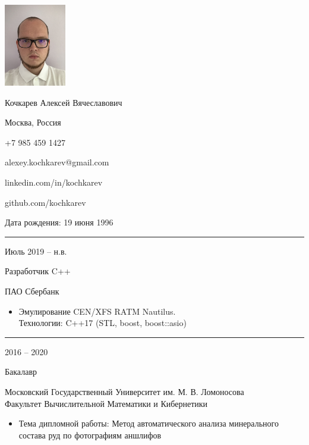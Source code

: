 \documentclass[a4paper,10pt]{article}
\newlength{\cvcolumngapwidth}
\newlength{\cvleftcolumnwidth}
\newlength{\cvrightcolumnwidth}
\newcommand{\cvnamestyle}[1]{{\Large\cvnamefont\textcolor{cvnamecolor}{#1}}}
\newcommand{\cvsectionstyle}[1]{{\normalsize\cvsectionfont\textcolor{cvsectioncolor}{#1}}}
\newcommand{\cvtitlestyle}[1]{{\large\cvtitlefont\textcolor{cvtitlecolor}{#1}}}
\newcommand{\cvdurationstyle}[1]{{\small\cvdurationfont\textcolor{cvdurationcolor}{#1}}}
\newlength{\cvafteritemskipamount}
\newlength{\cvaftersectionskipamount}
\newlength{\cvafternameskipamount}
\newlength{\cvafterpersonalinfolineskipamount}
\newlength{\cvaftertitleskipamount}
\newlength{\cvparskip}
\newcommand{\cvpersonalinfo}[2]{
    \begin{minipage}[t]{\cvleftcolumnwidth}
        \vspace{0mm} %
        \raggedleft #1
    \end{minipage}%
    \hspace{\cvcolumngapwidth}%
    \begin{minipage}[t]{\cvrightcolumnwidth}
        \vspace{0mm} %
        #2
    \end{minipage}

    \vspace{\cvafteritemskipamount}
}
\newcommand{\cvname}[1]{
    \cvnamestyle{#1}

    \vspace{\cvafternameskipamount}
}
\newcommand{\cvpersonalinfolinewithicon}[3]{
    \raisebox{.5\fontcharht\font`E-.5\height}{\texttt{[image: \#2]}}
    #3

    \vspace{\cvafterpersonalinfolineskipamount}
}
\newcommand{\cvsection}[1]{
    \begin{minipage}[t]{\cvleftcolumnwidth}
        \raggedleft\cvsectionstyle{#1}
    \end{minipage}%
    \hspace{\cvcolumngapwidth}%
    \begin{minipage}[t]{\cvrightcolumnwidth}
        \textcolor{cvrulecolor}{\rule{\cvrightcolumnwidth}{0.3mm}}
    \end{minipage}

    \vspace{\cvaftersectionskipamount}
}
\newcommand{\cvitem}[2]{
    \begin{minipage}[t]{\cvleftcolumnwidth}
        \raggedleft #1
    \end{minipage}%
    \hspace{\cvcolumngapwidth}%
    \begin{minipage}[t]{\cvrightcolumnwidth}
        \setlength{\parskip}{\cvparskip} #2
    \end{minipage}

    \vspace{\cvafteritemskipamount}
}
\newcommand{\cvtitle}[1]{
    \cvtitlestyle{#1}

    \vspace{\cvaftertitleskipamount}
    \vspace{-\cvparskip}
}
\begin{document}

\cvpersonalinfo{
    \includegraphics[height=36mm]{me.jpg}
}{
    \cvname{Кочкарев Алексей Вячеславович}

    \cvpersonalinfolinewithicon{height=4mm}{072-location.pdf}{
        Москва, Россия
    }

    \cvpersonalinfolinewithicon{height=4mm}{067-phone.pdf}{
        +7 985 459 1427
    }

    \cvpersonalinfolinewithicon{height=4mm}{070-envelop.pdf}{
        alexey.kochkarev@gmail.com
    }

    \cvpersonalinfolinewithicon{height=4mm}{458-linkedin.pdf}{
        linkedin.com/in/kochkarev
    }
    
    \cvpersonalinfolinewithicon{height=4mm}{github_logo.pdf}{
        github.com/kochkarev
    }

    Дата рождения: 19 июня 1996
}



\cvsection{ОПЫТ РАБОТЫ}

\cvitem{
    \cvdurationstyle{Июль 2019 -- н.в.}
}{
    \cvtitle{Разработчик C++}

    ПАО Сбербанк

    \begin{itemize}[leftmargin=*]
        \item Эмулирование CEN/XFS RATM Nautilus.\\ Технологии: C++17 (STL, boost, boost::asio)
    \end{itemize}
}



\cvsection{ОБРАЗОВАНИЕ}

\cvitem{
    \cvdurationstyle{2016 -- 2020}
}{
    \cvtitle{Бакалавр}

    Московский Государственный Университет им. М. В. Ломоносова \\ Факультет Вычислительной Математики и Кибернетики

    \begin{itemize}[leftmargin=*]
        \item Тема дипломной работы: Метод автоматического анализа минерального\\ состава руд по фотографиям аншлифов
    \end{itemize}
}
\end{document}

